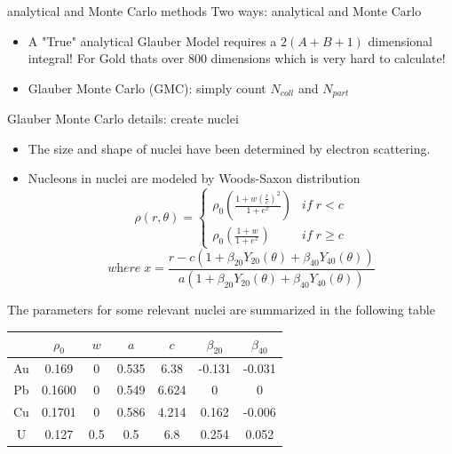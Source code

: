 \documentclass{beamer}
\begin{document}
\begin{frame}{analytical and Monte Carlo methods}
Two ways: analytical and Monte Carlo
\begin{itemize}
  \item A "True" analytical Glauber Model requires a $2(A+B+1)$ dimensional integral! For Gold thats over 800 dimensions which is very hard to calculate!
  \item Glauber Monte Carlo (GMC): simply count $N_{coll}$ and $N_{part}$
\end{itemize}
\end{frame}


\begin{frame}{Glauber Monte Carlo details: create nuclei}
  \begin{itemize}
    \item The size and shape of nuclei have been determined by electron scattering.
    \item Nucleons in nuclei are modeled by Woods-Saxon distribution
      \scriptsize
      \begin{equation}
      \rho(r,\theta)=\left\{
        \begin{array}{lr}
        \rho_0 \left( \frac{1+w\left(\frac{r}{c}\right)^2}{1+e^x} \right) & \textit{if} \; r<c \\
        \rho_0 \left( \frac{1+w}{1+e^x} \right) & \textit{if} \; r \ge c
        \end{array}
        \right.
      \end{equation}
      \begin{equation}
      \textit{where}\; x=\frac{r-c(1+\beta_{20}Y_{20}(\theta)+\beta_{40}Y_{40}(\theta))}{a(1+\beta_{20}Y_{20}(\theta)+\beta_{40}Y_{40}(\theta))}
      \end{equation}
  \end{itemize}
      The parameters for some relevant nuclei are summarized in the following table%
      \begin{center}
      \scriptsize
      \begin{tabular}{|c|c|c|c|c|c|c|}
      \hline
       & $\rho_0$ & $w$ & $a$ & $c$ & $\beta_{20}$ & $\beta_{40}$ \\
       \hline
       Au & 0.169 & 0 & 0.535 & 6.38 & -0.131 & -0.031 \\
       \hline
       Pb & 0.1600 & 0 & 0.549 & 6.624 & 0 & 0 \\
       \hline
       Cu & 0.1701 & 0 & 0.586 & 4.214 & 0.162 & -0.006 \\
       \hline
       U & 0.127 & 0.5 & 0.5 & 6.8 & 0.254 & 0.052 \\
       \hline
      \end{tabular}
      \end{center}
\end{frame}
\end{document}
